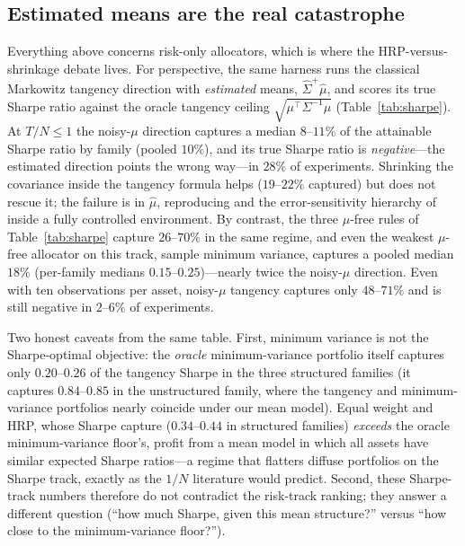 \documentclass[11pt]{article}
\newcommand{\Sig}{\Sigma}
\newcommand{\Sighat}{\widehat{\Sigma}}
\newcommand{\muhat}{\widehat{\mu}}
\newcommand{\TN}{T/N}
\begin{document}
\subsection{Estimated means are the real catastrophe}
\label{sec:mu}

Everything above concerns risk-only allocators, which is where the
HRP-versus-shrinkage debate lives. For perspective, the same harness runs
the classical Markowitz tangency direction with \emph{estimated} means,
$\Sighat^{+}\muhat$, and scores its true Sharpe ratio against the oracle
tangency ceiling $\sqrt{\mu^{\top}\Sig^{-1}\mu}$
(Table~\ref{tab:sharpe}). At $\TN\le1$ the noisy-$\mu$ direction captures a
median $8$--$11\%$ of the attainable Sharpe ratio by family (pooled
$10\%$), and its true Sharpe ratio is \emph{negative}---the estimated
direction points the wrong way---in $28\%$ of experiments. Shrinking the
covariance inside the tangency formula helps ($19$--$22\%$ captured) but
does not rescue it; the failure is in $\muhat$, reproducing
\citet{demiguel2009optimal} and the error-sensitivity hierarchy of
\citet{chopra1993effect} inside a fully controlled environment. By contrast,
the three $\mu$-free rules of Table~\ref{tab:sharpe} capture $26$--$70\%$ in
the same regime, and even the weakest $\mu$-free allocator on this track,
sample minimum variance, captures a pooled median $18\%$ (per-family medians
$0.15$--$0.25$)---nearly twice the noisy-$\mu$ direction. Even with
ten observations per asset, noisy-$\mu$ tangency captures only $48$--$71\%$
and is still negative in $2$--$6\%$ of experiments.

Two honest caveats from the same table. First, minimum variance is not the
Sharpe-optimal objective: the \emph{oracle} minimum-variance portfolio
itself captures only $0.20$--$0.26$ of the tangency Sharpe in the three
structured families (it captures $0.84$--$0.85$ in the unstructured family,
where the tangency and minimum-variance portfolios nearly coincide under our
mean model). Equal weight and HRP, whose Sharpe capture ($0.34$--$0.44$ in
structured families) \emph{exceeds} the oracle minimum-variance floor's,
profit from a mean model in which all assets have similar expected Sharpe
ratios---a regime that flatters diffuse portfolios on the Sharpe track,
exactly as the $1/N$ literature would predict. Second, these Sharpe-track
numbers therefore do not contradict the risk-track ranking; they answer a
different question (``how much Sharpe, given this mean structure?'' versus
``how close to the minimum-variance floor?'').
\end{document}
